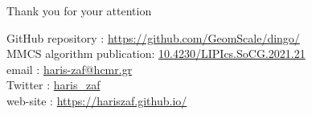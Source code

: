 \documentclass{beamer}
\begin{document}


            
         




   \begin{darkframes}
   \begin{frame}{Thank you for your attention}
         
      GitHub repository  : \href{https://github.com/GeomScale/dingo/}{https://github.com/GeomScale/dingo/} \\ 

      MMCS algorithm publication: \href{10.4230/LIPIcs.SoCG.2021.21}{10.4230/LIPIcs.SoCG.2021.21} \\ 
      
      \bigskip
      email    : \href{haris-zaf@hcmr.gr}{haris-zaf@hcmr.gr} \\
      Twitter  : \href{https://twitter.com/haris_zaf}{haris\_zaf} \\
      web-site : \url{https://hariszaf.github.io/} \\





\end{frame}
\end{darkframes}
\end{document}
